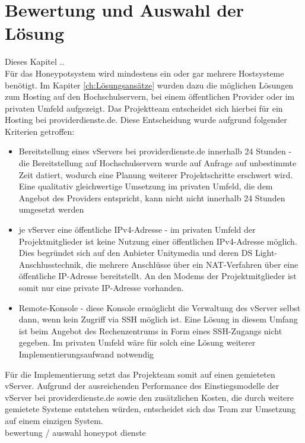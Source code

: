 \chapter{Bewertung und Auswahl der Lösung}
\label{ch:Bewertung und Auswahl der Lösung}

Dieses Kapitel .. \\


Für das Honeypotsystem wird mindestens ein oder gar mehrere Hostsysteme benötigt. Im Kapiter \ref{ch:Lösungsansätze} wurden dazu die möglichen Lösungen zum Hosting auf den Hochschulservern, bei einem öffentlichen Provider oder im privaten Umfeld aufgezeigt. Das Projektteam entscheidet sich hierbei für ein Hosting bei providerdienste.de. Diese Entscheidung wurde aufgrund folgender Kriterien getroffen:

\begin{itemize}
\item Bereitstellung eines vServers bei providerdienste.de innerhalb 24 Stunden - die Bereitstellung auf Hochschulservern wurde auf Anfrage auf unbestimmte Zeit datiert, wodurch eine Planung weiterer Projektschritte erschwert wird. Eine qualitativ gleichwertige Umsetzung im privaten Umfeld, die dem Angebot des Providers entspricht, kann nicht nicht innerhalb 24 Stunden umgesetzt werden
\item je vServer eine öffentliche IPv4-Adresse - im privaten Umfeld der Projektmitglieder ist keine Nutzung einer öffentlichen IPv4-Adresse möglich. Dies begründet sich auf den Anbieter Unitymedia und deren DS Light-Anschlusstechnik, die mehrere Anschlüsse über ein NAT-Verfahren über eine öffentliche IP-Adresse bereitstellt. An den Modems der Projektmitglieder ist somit nur eine private IP-Adresse vorhanden.
\item Remote-Konsole - diese Konsole ermöglicht die Verwaltung des vServer selbst dann, wenn kein Zugriff via SSH möglich ist. Eine Lösung in diesem Umfang ist beim Angebot des Rechenzentrums in Form eines SSH-Zugangs nicht gegeben. Im privaten Umfeld wäre für solch eine Lösung weiterer Implementierungsaufwand notwendig
\end{itemize}

Für die Implementierung setzt das Projekteam somit auf einen gemieteten vServer. Aufgrund der ausreichenden Performance des Einstiegsmodelle der vServer bei providerdienste.de sowie den zusätzlichen Kosten, die durch weitere gemietete Systeme entstehen würden, entscheidet sich das Team zur Umsetzung auf einem einzigen System.\\

bewertung / auswahl honeypot dienste